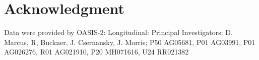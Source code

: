 \documentclass[journal]{IEEEtran}
\begin{document}

%

\section*{Acknowledgment}
Data were provided by OASIS-2: Longitudinal: Principal Investigators: D. Marcus, R, Buckner, J. Csernansky, J. Morris; P50 AG05681, P01 AG03991, P01 AG026276, R01 AG021910, P20 MH071616, U24 RR021382


\ifCLASSOPTIONcaptionsoff
  \newpage
\fi





%
%
%
\end{document}

